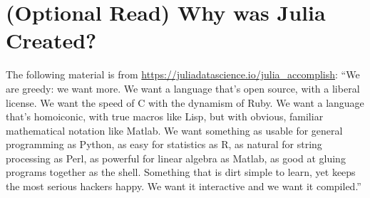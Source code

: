 \setlength{\fboxrule}{3pt}%
	\centerline{ %
}



\section{(Optional Read) Why was Julia Created?}


The following material is from \url{https://juliadatascience.io/julia_accomplish}: 
``We are greedy: we want more. We want a language that’s open source, with a liberal license. We want the speed of C with the dynamism of Ruby. We want a language that’s homoiconic, with true macros like Lisp, but with obvious, familiar mathematical notation like Matlab. We want something as usable for general programming as Python, as easy for statistics as R, as natural for string processing as Perl, as powerful for linear algebra as Matlab, as good at gluing programs together as the shell. Something that is dirt simple to learn, yet keeps the most serious hackers happy. We want it interactive and we want it compiled.''


